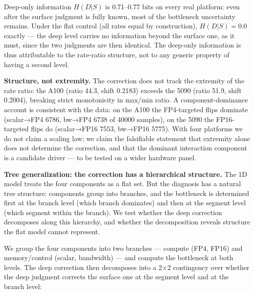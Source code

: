 {{{Deep-only information \(H(D|S)\) is 0.71--0.77 bits on every real platform: even after the surface judgment is fully known, most of the bottleneck uncertainty remains. Under the flat control (all rates equal by construction), \(H(D|S) = 0.0\) exactly --- the deep level carries no information beyond the surface one, as it must, since the two judgments are then identical. The deep-only information is thus attributable to the rate-ratio structure, not to any generic property of having a second level.

\textbf{Structure, not extremity.} The correction does not track the extremity of the rate ratio: the A100 (ratio 44.3, shift 0.2183) exceeds the 5090 (ratio 51.9, shift 0.2004), breaking strict monotonicity in max/min ratio. A component-dominance account is consistent with the data: on the A100 the FP4-targeted flips dominate (scalar→FP4 6786, bw→FP4 6738 of 40000 samples), on the 5090 the FP16-targeted flips do (scalar→FP16 7553, bw→FP16 5775). With four platforms we do not claim a scaling law; we claim the falsifiable statement that extremity alone does not determine the correction, and that the dominant interaction component is a candidate driver --- to be tested on a wider hardware panel.

\textbf{Tree generalization: the correction has a hierarchical structure.} The 1D model treats the four components as a flat set. But the diagnosis has a natural tree structure: components group into branches, and the bottleneck is determined first at the branch level (which branch dominates) and then at the segment level (which segment within the branch). We test whether the deep correction decomposes along this hierarchy, and whether the decomposition reveals structure the flat model cannot represent.

We group the four components into two branches --- compute (FP4, FP16) and memory/control (scalar, bandwidth) --- and compute the bottleneck at both levels. The deep correction then decomposes into a 2×2 contingency over whether the deep judgment corrects the surface one at the segment level and at the branch level:

}}}
